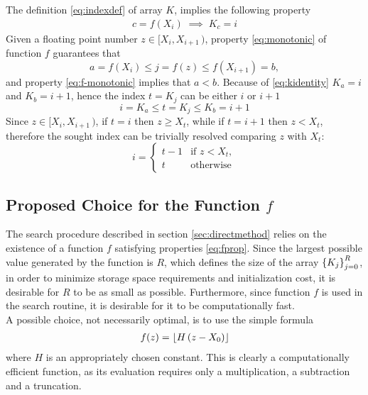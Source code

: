 \documentclass[preprint,1p,times]{elsarticle}
\begin{document}
The definition \eqref{eq:indexdef} of array $K$, implies the following property
\begin{align}
\label{eq:kidentity}
   c=f(X_i) \; \implies \; K_c=i
\end{align}
Given a floating point number $z\in[X_{i},X_{i+1}\,)$, property \eqref{eq:monotonic} of function $f$ guarantees that
$$
 	a=f(X_{i}) \leq j=f(z) \leq f(X_{i+1})=b,
$$
and property \eqref{eq:f-monotonic} implies that $a<b$. Because of \eqref{eq:kidentity} $K_a=i$ and $K_b=i+1$, hence the index $t=K_j$ can be either $i$ or $i+1$
$$i = K_a \leq t=K_j \leq K_b = i+1$$
Since $z\in[X_{i},X_{i+1}\,)$, if $t=i$ then $z \geq X_t$, while if $t=i+1$ then $z<X_t$, therefore the sought index can be trivially resolved comparing $z$ with $X_t$:
$$
i = 
\left\{
	\begin{array}{ll}
		t-1 & \text{if } z < X_t,  \\
		t   & \text{otherwise}
	\end{array}
\right.
$$

\subsection{Proposed Choice for the Function $f$}
\label{sec:constructf}
The search procedure described in section \ref{sec:directmethod} relies on the existence of a function $f$ satisfying properties \eqref{eq:fprop}. Since the largest possible value generated by the function is $R$, which defines the size of the array $\left \{ K_j \right \}_{j=0}^R$, in order to minimize storage space requirements and initialization cost, it is desirable for $R$ to be as small as possible. Furthermore, since function $f$ is used in the search routine, it is desirable for it to be computationally fast. \\

A possible choice, not necessarily optimal, is to use the simple formula
\begin{align}
\label{eq:function}
	f(z) = \left \lfloor  H\, (z-X_0)  \right \rfloor
\end{align}
where $H$ is an appropriately chosen constant.  This is clearly a computationally efficient function, as its evaluation requires only a multiplication, a subtraction and a truncation.
\end{document}
